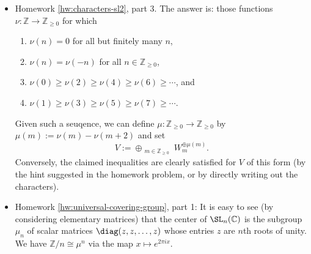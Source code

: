 \documentclass[reqno]{amsart} 
\begin{document}
\begin{itemize}
\item
  Homework \ref{hw:characters-sl2},
  part 3.
  The answer is:
  those functions $\nu : \mathbb{Z} \rightarrow \mathbb{Z}_{\geq
    0}$
  for which
  \begin{enumerate}
  \item $\nu(n) = 0$ for all but finitely many $n$,
  \item $\nu(n) = \nu(-n)$ for all $n \in \mathbb{Z}_{\geq 0}$,
  \item 
    $\nu(0) \geq \nu(2) \geq \nu(4) \geq \nu(6) \geq \dotsb$, and
  \item 
    $\nu(1) \geq \nu(3) \geq \nu(5) \geq \nu(7) \geq \dotsb$.
  \end{enumerate}
  Given such a seuqence,
  we can define
  $\mu : \mathbb{Z}_{\geq 0} \rightarrow \mathbb{Z}_{\geq 0}$
  by $\mu(m) := \nu(m) - \nu(m + 2)$
  and set
  \begin{equation*}
  V := \oplus_{\substack{
      m \in \mathbb{Z}_{\geq 0}
    }
  }
  W_m^{\oplus \mu(m)}.
  \end{equation*}
  Conversely, the claimed inequalities
  are clearly satisfied
  for $V$ of this form
  (by the hint suggested in the homework problem,
  or by directly writing out the characters).
\item Homework \ref{hw:universal-covering-group}, part 1:
  It is easy to see (by considering
  elementary matrices)
  that the center of $\SL_n(\mathbb{C})$
  is the subgroup $\mu_n$ of scalar matrices $\diag(z,z,\dotsc,z)$
  whose entries $z$ are $n$th roots of unity.
  We have $\mathbb{Z}/n \cong \mu^n$
  via the map $x \mapsto e^{2 \pi i x}$.



\end{itemize}
\end{document}
